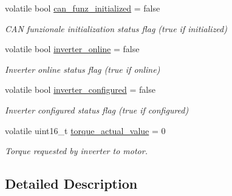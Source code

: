 \begin{DoxyCompactItemize}
\item 
\mbox{\label{group___c_a_n__funzionale__group_ga8cd40fe9b965184307fe5886fcef6236}} 
volatile bool \mbox{\hyperlink{group___c_a_n__funzionale__group_ga8cd40fe9b965184307fe5886fcef6236}{can\+\_\+funz\+\_\+initialized}} = false
\begin{DoxyCompactList}\small\item\em C\+AN funzionale initialization status flag (true if initialized) \end{DoxyCompactList}\item 
\mbox{\label{group___c_a_n__funzionale__group_ga392f688b1edd69f29b48818a5b9b19ae}} 
volatile bool \mbox{\hyperlink{group___c_a_n__funzionale__group_ga392f688b1edd69f29b48818a5b9b19ae}{inverter\+\_\+online}} = false
\begin{DoxyCompactList}\small\item\em Inverter online status flag (true if online) \end{DoxyCompactList}\item 
\mbox{\label{group___c_a_n__funzionale__group_ga979fff19d884e9a83eecc2309b36ad0c}} 
volatile bool \mbox{\hyperlink{group___c_a_n__funzionale__group_ga979fff19d884e9a83eecc2309b36ad0c}{inverter\+\_\+configured}} = false
\begin{DoxyCompactList}\small\item\em Inverter configured status flag (true if configured) \end{DoxyCompactList}\item 
\mbox{\label{group___c_a_n__funzionale__group_ga99ead1878913db87bc7cc808a8392e21}} 
volatile uint16\+\_\+t \mbox{\hyperlink{group___c_a_n__funzionale__group_ga99ead1878913db87bc7cc808a8392e21}{torque\+\_\+actual\+\_\+value}} = 0
\begin{DoxyCompactList}\small\item\em Torque requested by inverter to motor. \end{DoxyCompactList}\end{DoxyCompactItemize}


\subsection{Detailed Description}


